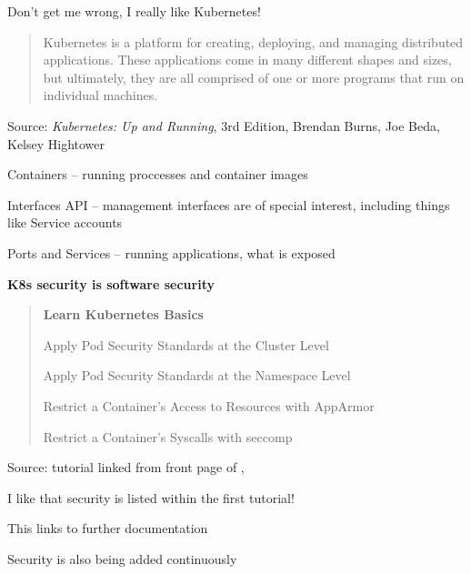 \documentclass[Screen16to9,17pt]{foils}
\begin{document}
Don't get me wrong, I really like Kubernetes!



\begin{quote}
Kubernetes is a platform for creating, deploying, and managing distributed applications. These applications come in many different shapes and sizes, but ultimately, they are all comprised of one or more programs that run on individual machines.
\end{quote}
Source: \emph{Kubernetes: Up and Running}, 3rd Edition, Brendan Burns, Joe Beda, Kelsey Hightower

\begin{list2}
\item Containers -- running proccesses and container images
\item Interfaces API -- management interfaces are of special interest, including things like Service accounts
\item Ports and Services -- running applications, what is exposed
\item {\bf K8s security is software security}
\end{list2}






\begin{quote}
{\bf Learn Kubernetes Basics}
\begin{list2}
\item Apply Pod Security Standards at the Cluster Level
\item Apply Pod Security Standards at the Namespace Level
\item Restrict a Container's Access to Resources with AppArmor
\item Restrict a Container's Syscalls with seccomp
\end{list2}
\end{quote}
Source: tutorial  linked from front page of ,\\

\begin{list2}
\item I like that security is listed within the first tutorial!
\item This links to further documentation
\item Security is also being added continuously
\end{list2}
\end{document}
